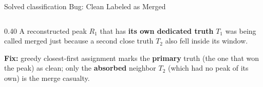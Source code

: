 \documentclass[xcolor=table,aspectratio=169]{beamer}
\begin{document}
\begin{frame}{Solved classification Bug: Clean Labeled as Merged}
    \begin{columns}[c]
        \begin{column}{0.40\linewidth}
            \footnotesize
            A reconstructed peak $R_1$ that has \textbf{its own dedicated truth}
            $T_1$ was being called \textcolor{myred}{merged} just because a second
            close truth $T_2$ also fell inside its window.

            \vspace{0.5em}
            \textbf{Fix:} greedy closest-first assignment marks the
            \textbf{primary} truth (the one that won the peak) as
            \textcolor{mygreen!70!black}{clean}; only the \textbf{absorbed}
            neighbor $T_2$ (which had no peak of its own) is the merge casualty.


\end{column}
\end{columns}
\end{frame}
\end{document}
